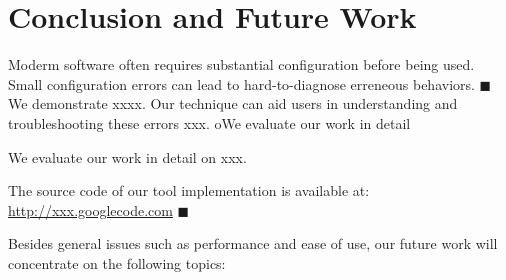 \section{Conclusion and Future Work}

Moderm software often requires substantial configuration
before being used. Small configuration errors can lead to
hard-to-diagnose erreneous behaviors.
$\blacksquare$ We demonstrate xxxx.
Our technique can aid users in understanding and
troubleshooting these errors xxx.
oWe evaluate our work in detail

We evaluate our work in detail on xxx.

The source code of our tool implementation is available at:
\url{http://xxx.googlecode.com} $\blacksquare$

\vspace{1mm}

Besides general issues such as performance and ease of use, our future
work will concentrate on the following topics:



